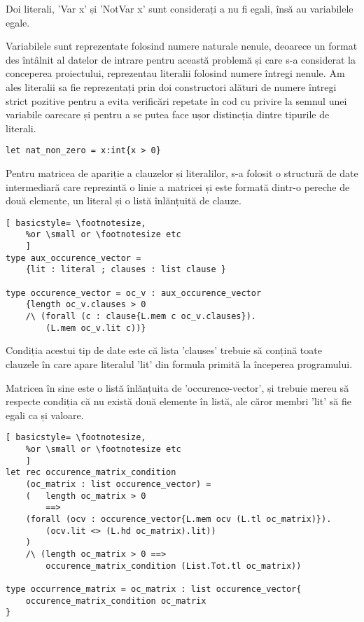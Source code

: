 Doi literali, 'Var x' și 'NotVar x' sunt considerați a nu fi egali, însă au variabilele egale.
	
Variabilele sunt reprezentate folosind numere naturale nenule, deoarece un \newline format des întâlnit al datelor de intrare pentru această problemă și care s-a considerat la conceperea proiectului, reprezentau literalii folosind numere întregi nenule. Am ales literalii sa fie reprezentați prin doi constructori alături de numere întregi strict pozitive pentru a evita verificări repetate în cod cu privire la semnul unei variabile oarecare și pentru a se putea face ușor distincția dintre tipurile de literali.

\begin{lstlisting}[]
let nat_non_zero = x:int{x > 0}
\end{lstlisting}

Pentru matricea de apariție a clauzelor și literalilor, s-a folosit o structură de date intermediară care reprezintă o linie a matricei și este formată dintr-o pereche de două \newline elemente, un literal și o listă înlănțuită de clauze.

\begin{lstlisting}[	basicstyle= \footnotesize, 
	%or \small or \footnotesize etc
	]
type aux_occurence_vector = 
	{lit : literal ; clauses : list clause }

type occurence_vector = oc_v : aux_occurence_vector
	{length oc_v.clauses > 0 
	/\ (forall (c : clause{L.mem c oc_v.clauses}). 
		(L.mem oc_v.lit c))}
\end{lstlisting}

Condiția acestui tip de date este că lista 'clauses' trebuie să conțină toate clauzele în care apare literalul 'lit' din formula primită la începerea programului.

Matricea în sine este o listă înlănțuita de 'occurence-vector', și trebuie mereu să respecte condiția că nu există două elemente în listă, ale căror membri 'lit' să fie egali ca și valoare.

\newpage

\begin{lstlisting}[	basicstyle= \footnotesize, 
	%or \small or \footnotesize etc
	]
let rec occurence_matrix_condition 
	(oc_matrix : list occurence_vector) = 
	(   length oc_matrix > 0 
		==> 
	(forall (ocv : occurence_vector{L.mem ocv (L.tl oc_matrix)}). 
		(ocv.lit <> (L.hd oc_matrix).lit))
	)
	/\ (length oc_matrix > 0 ==> 
		occurence_matrix_condition (List.Tot.tl oc_matrix))

type occurrence_matrix = oc_matrix : list occurence_vector{
	occurence_matrix_condition oc_matrix 
}
\end{lstlisting}

